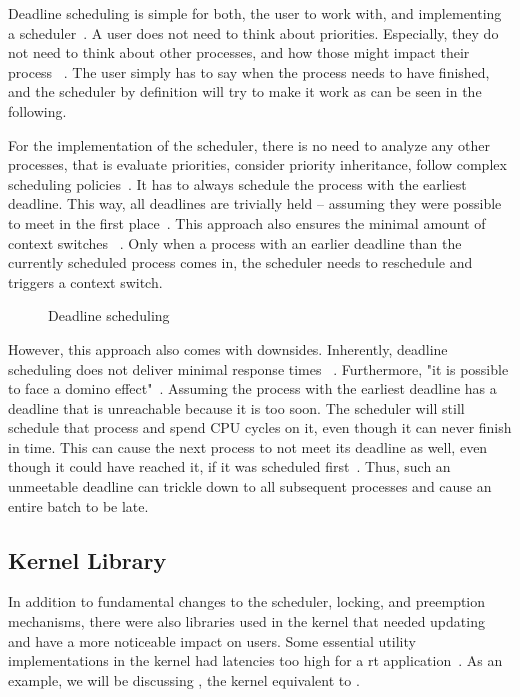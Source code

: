 \documentclass[10pt,twocolumn,a4paper]{article}
\begin{document}
Deadline scheduling is simple for both, the user to work with, and implementing a scheduler~\cite{bristot_de_oliveira_deadline_2018}.
A user does not need to think about priorities.
Especially, they do not need to think about other processes, and how those might impact their process ~\cite{bristot_de_oliveira_deadline_2018}.
The user simply has to say when the process needs to have finished, and the scheduler by definition will try to make it work as can be seen in the following.

For the implementation of the scheduler, there is no need to analyze any other processes, that is evaluate priorities, consider priority inheritance, follow complex scheduling policies~\cite{bristot_de_oliveira_deadline_2018}.
It has to always schedule the process with the earliest deadline.
This way, all deadlines are trivially held -- assuming they were possible to meet in the first place~\cite{bristot_de_oliveira_deadline_2018}.
This approach also ensures the minimal amount of context switches ~\cite{bristot_de_oliveira_deadline_2018}.
Only when a process with an earlier deadline than the currently scheduled process comes in, the scheduler needs to reschedule and triggers a context switch.

\begin{figure}[htb]
  \centering
  
  \caption{Deadline scheduling}
\end{figure}

However, this approach also comes with downsides.
Inherently, deadline scheduling does not deliver minimal response times ~\cite{bristot_de_oliveira_deadline_2018}.
Furthermore, "it is possible to face a domino effect"~\cite[Daniel Bristot de Oliveira]{bristot_de_oliveira_deadline_2018}.
Assuming the process with the earliest deadline has a deadline that is unreachable because it is too soon.
The scheduler will still schedule that process and spend CPU cycles on it, even though it can never finish in time.
This can cause the next process to not meet its deadline as well, even though it could have reached it, if it was scheduled first~\cite{bristot_de_oliveira_deadline_2018}.
Thus, such an unmeetable deadline can trickle down to all subsequent processes and cause an entire batch to be late.


\subsection{Kernel Library}
In addition to fundamental changes to the scheduler, locking, and preemption mechanisms, there were also libraries used in the kernel that needed updating and have a more noticeable impact on users.
Some essential utility implementations in the kernel had latencies too high for a \acrshort{rt} application~\cite{edge_discussion_2022}.
As an example, we will be discussing , the kernel equivalent to .
\end{document}
